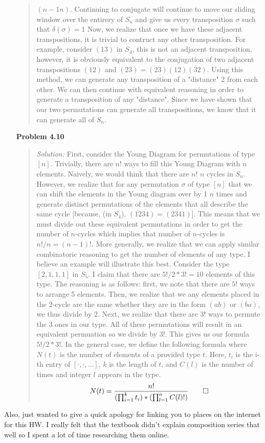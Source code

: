 \documentclass{article}
\newcommand{\Solution}{\textit{Solution: }}
\begin{document}
\begin{enumerate}
\begin{quote}
            $(n-1n)$. Continuing to conjugate will continue to move our sliding window over the entirery of $S_n$ and give us every transposition $\sigma$ such that $\delta(\sigma) = 1$ Now, we realize
            that once we have these adjacent transpositions, it is trivial to contruct any other transposition. For example, consider $(13)$ in $S_4$, this is not an adjacent transposition, however, it 
            is obviously equivalent to the conjugation of two adjacent transpositions $(12)$ and $(23) = (23)(12)(32)$. Using this method, we can generate any transposition of a "distance" 2 from each other.
            We can then continue with equivalent reasoning in order to generate a transposition of any "distance". Since we have shown that our two permutations can generate all transpositions, we know that it
            can generate all of $S_n$. \qedsymbol
        \end{quote} 
        \item[\textbf{Problem 4.10}]
        \begin{quote}
            \Solution First, consider the Young Diagram for permutations of type $[n]$. Trivially, there are $n!$ ways to fill this Young Diagram with $n$ elements. Naively, we would think that there are $n!$ $n$ cycles in $S_n$. 
            However, we realize that for any permutation $\sigma$ of type $[n]$ that we can shift the elements in 
            the Young diagram over by 1 $n$ times and generate distinct permutations of the elements that all describe the same cycle [because, (in $S_4$), $(1234) = (2341)$]. This means that we must divide out these equivalent 
            permutations in order to get the number of $n$-cycles which implies that number of $n$-cycles is $n!/n = (n-1)!$.
            More generally, we realize that we can apply similar combinatoric reasoning to get the number of elements of any type. I believe an example will illustrate this best.
            Consider the type $[2, 1, 1, 1]$ in $S_5$. I claim that there are $5! / 2*3! = 10$ elements of this type. The reasoning is as follows: first, we note that there are $5!$ ways to arrange 5 elements. Then, we realize that 
            we any elements placed in the 2-cycle are the same whether they are in the form $(ab)$ or $(ba)$, we thus divide by 2. Next, we realize that there are $3!$ ways to permute the 3 ones in our type. All of these permutations
            will result in an equivalent permuation so we divide by $3!$. This gives us our formula $5! / 2*3!$. In the general case, we define the following formula where $N(t)$ is the number of elements of a provided type $t$. Here,
            $t_i$ is the i-th entry of $[\cdot, \cdot, \dots]$, $k$ is the length of $t$, and $C(l)$ is the number of times and integer $l$ appears in the type.
            \begin{equation}\label{type-count}
                N(t) = \frac{n!}{(\prod_{i = 1}^k t_i) * (\prod_{l = 1}^n C(l)!)} \qed
            \end{equation}
        \end{quote}
    \end{enumerate}
    Also, just wanted to give a quick apology for linking you to places on the internet for this HW. I really felt that the textbook didn't explain composition series that well so I spent a lot of time researching them online.
\end{document}
